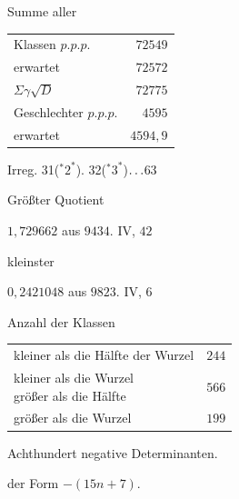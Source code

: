 \par\medskip\noindent Summe aller
\begin{center}\begin{tabular}{@{}lr@{}}
Klassen $p.p.p.$ & $72549$\\
\quad erwartet & $72572$\\
\quad $\Sigma\gamma\surd D$ & $72775$\\
Geschlechter $p.p.p.$ & $4595$\\
\quad erwartet & $4594{,}9$
\end{tabular}\end{center}
\noindent Irreg. 31(${}^{*}2^{*}$). 32(${}^{*}3^{*}$)\(\mathinner{.\,.\,.}\)63
\par\noindent Größter Quotient
\par\noindent\quad $1{,}729662$ aus $9434$. IV, $42$
\par\noindent kleinster
\par\noindent\quad $0{,}2421048$ aus $9823$. IV, $6$
\par\noindent Anzahl der Klassen
\begin{center}\begin{tabular}{@{}lr@{}}
kleiner als die Hälfte der Wurzel & $244$\\
\shortstack[l]{kleiner als die Wurzel\\\quad größer als die Hälfte} & $566$\\
größer als die Wurzel & $199$
\end{tabular}\end{center}
\par\medskip
{}
\noindent Achthundert negative Determinanten.\par\noindent der Form $-(15n+7)$.
\par\medskip
\begingroup\small
\setlength{\tabcolsep}{4pt}
